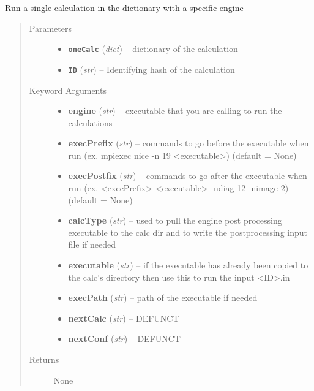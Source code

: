 \documentclass[letterpaper,10pt,english]{sphinxmanual}
\begin{document}
\begin{fulllineitems}
\label{run:run.__oneRun}
Run a single calculation in the dictionary with a specific engine
\begin{quote}\begin{description}
\item[{Parameters}] \leavevmode\begin{itemize}
\item {} 
\textbf{\texttt{oneCalc}} (\emph{dict}) -- dictionary of the calculation

\item {} 
\textbf{\texttt{ID}} (\emph{str}) -- Identifying hash of the calculation

\end{itemize}

\item[{Keyword Arguments}] \leavevmode\begin{itemize}
\item {} 
\textbf{engine} (\emph{str}) --
executable that you are calling to run the calculations

\item {} 
\textbf{execPrefix} (\emph{str}) --
commands to go before the executable when run
(ex. mpiexec nice -n 19 \textless{}executable\textgreater{}) (default = None)

\item {} 
\textbf{execPostfix} (\emph{str}) --
commands to go after the executable when run
(ex. \textless{}execPrefix\textgreater{} \textless{}executable\textgreater{} -ndiag 12 -nimage 2) (default = None)

\item {} 
\textbf{calcType} (\emph{str}) --
used to pull the engine post processing executable to the calc dir
and to write the postprocessing input file if needed

\item {} 
\textbf{executable} (\emph{str}) --
if the executable has already been copied to the calc's directory
then use this to run the input \textless{}ID\textgreater{}.in

\item {} 
\textbf{execPath} (\emph{str}) --
path of the executable if needed

\item {} 
\textbf{nextCalc} (\emph{str}) --
DEFUNCT

\item {} 
\textbf{nextConf} (\emph{str}) --
DEFUNCT

\end{itemize}

\item[{Returns}] \leavevmode
None

\end{description}\end{quote}

\end{fulllineitems}
\end{document}
